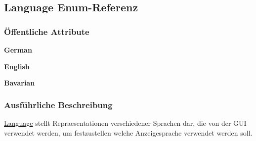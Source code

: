 \hypertarget{a00015}{\subsection{Language Enum-\/\-Referenz}
\label{a00015}
}
\subsubsection*{Öffentliche Attribute}
\begin{DoxyCompactItemize}
\item 
\hypertarget{a00015_a18bff3d9892c435006ca22f43a9f031f}{{\bfseries German}}\label{a00015_a18bff3d9892c435006ca22f43a9f031f}

\item 
\hypertarget{a00015_ad896b63205779b1b09e86d941ce13976}{{\bfseries English}}\label{a00015_ad896b63205779b1b09e86d941ce13976}

\item 
\hypertarget{a00015_aa64e5cb9632a29402dcad87cb8e7289c}{{\bfseries Bavarian}}\label{a00015_aa64e5cb9632a29402dcad87cb8e7289c}

\end{DoxyCompactItemize}


\subsubsection{Ausführliche Beschreibung}
\hyperlink{a00015}{Language} stellt Repraesentationen verschiedener Sprachen dar, die von der G\-U\-I verwendet werden, um festzustellen welche Anzeigesprache verwendet werden soll. 